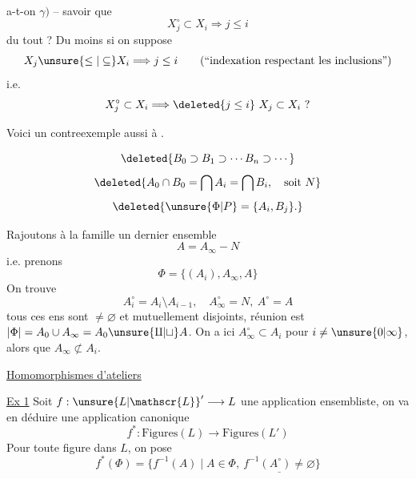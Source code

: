 a-t-on $\gamma)$ -- savoir que
\[
X_j^\circ\subset X_i\Longrightarrow j\leq i
\]
du tout ? Du moins si  on suppose
\[
X_j\unsure{\leq|\subseteq}X_i\Longrightarrow j\leq i\qquad\text{(``indexation respectant les inclusions'')}
\]
i.e.
\[
X_j^\circ\subset X_i\Longrightarrow\deleted{j\leq i}\ X_j\subset X_i\ ?
\]

Voici un  contreexemple aussi à .

\[
\deleted{B_0\supset B_1\supset\cdots B_n\supset\cdots}
\]
\[
\deleted{A_0\cap B_0=\bigcap A_i=\bigcap B_i,\quad\text{soit }N}
\]
\[
\deleted{\unsure{\Phi|P}=\{A_i,B_j\}.}
\]

Rajoutons à la famille un dernier ensemble
\[
A=A_\infty-N
\]
i.e. prenons
\[
\Phi=\{(A_i),A_\infty,A\}
\]
On trouve
\[
A_i^\circ=A_i\setminus A_{i-1},\quad A_\infty^\circ=N,\ A^\circ=A
\]
tous ces ens sont $\ne\varnothing$ et mutuellement disjoints, réunion est $|\Phi|=A_0\cup A_\infty=A_0\unsure{\amalg|\sqcup}A$.
On a ici $A_\infty^\circ\subset A_i$ pour $i\ne\unsure{0|\infty}$, alors que $A_\infty\not\subset A_i$.

\uline{Homomorphismes  d'ateliers}


\uline{Ex 1} Soit $f:{\unsure{L|\mathscr{L}}}'\longrightarrow L$ une application ensembliste, on va en déduire une application canonique
\[
f^*:\mathrm{Figures}(L)\longrightarrow\mathrm{Figures}(L')
\]
Pour toute figure  dans $L$, on pose
\[
f^*(\Phi)=\{f^{-1}(A)\mid A\in\Phi,\ \underline{f^{-1}(A^\circ)\ne\varnothing}\}\tag*{(1)}
\]

